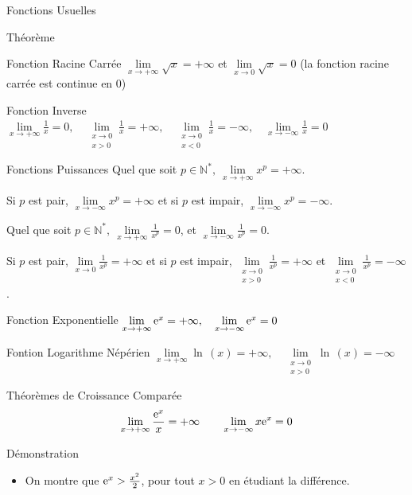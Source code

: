 \documentclass{coursbook}
\begin{document}
    \begin{Gpartie}{Fonctions Usuelles} 
        \begin{Spartie}{Théorème} 
            \begin{SSpartie}{Fonction Racine Carrée} 
                $\lim\limits_{x\to+\infty}\sqrt{x}=+\infty$ et $\lim\limits_{x\to0}\sqrt{x}=0$ (la fonction racine carrée est continue en $0$)
            \end{SSpartie}
            \begin{SSpartie}{Fonction Inverse} 
                $\lim\limits_{x\to+\infty}\frac{1}{x}=0,\quad\lim\limits_{\substack{x\to 0 \\ x>0}}\frac{1}{x}=+\infty,\quad\lim\limits_{\substack{x\to 0 \\ x<0}}\frac{1}{x}=-\infty,\quad\lim\limits_{x\to-\infty}\frac{1}{x}=0$
            \end{SSpartie}
            \begin{SSpartie}{Fonctions Puissances} 
                Quel que soit $p\in\mathbb{N^*},~\lim\limits_{x\to+\infty}x^p=+\infty$.

                Si $p$ est pair, $\lim\limits_{x\to-\infty}x^p=+\infty$ et si $p$ est impair, $\lim\limits_{x\to-\infty}x^p=-\infty$.
                
                Quel que soit $p\in\mathbb{N^*},~\lim\limits_{x\to+\infty}\frac{1}{x^p}=0$, et $\lim\limits_{x\to-\infty}\frac{1}{x^p}=0$.

                Si $p$ est pair, $\lim\limits_{x\to0}\frac{1}{x^p}=+\infty$ et si $p$ est impair, $\lim\limits_{\substack{x\to0 \\ x>0}}\frac{1}{x^p}=+\infty$ et $\lim\limits_{\substack{x\to0 \\ x<0}}\frac{1}{x^p}=-\infty$.
            \end{SSpartie}
            \begin{SSpartie}{Fonction Exponentielle} 
                $\lim\limits_{x\to+\infty}\mathrm{e}^x=+\infty,\quad\lim\limits_{x\to-\infty}\mathrm{e}^x=0$
            \end{SSpartie}
            \begin{SSpartie}{Fontion Logarithme Népérien} 
                $\lim\limits_{x\to+\infty}\ln\,(x)=+\infty,\quad\lim\limits_{\substack{x\to0 \\ x>0}}\ln\,(x)=-\infty$
            \end{SSpartie}
        \end{Spartie}
        \begin{Spartie}{Théorèmes de Croissance Comparée} 
            \[\lim\limits_{x\to+\infty}\frac{\me^x}{x}=+\infty\qquad\lim\limits_{x\to-\infty}x\me^x=0\]
            \begin{SSpartie}{Démonstration} 
                \begin{itemize}
                    \item On montre que $\me^x>\frac{x^2}{2}$, pour tout $x>0$ en étudiant la différence.


\end{itemize}
\end{SSpartie}
\end{Spartie}
\end{Gpartie}
\end{document}
